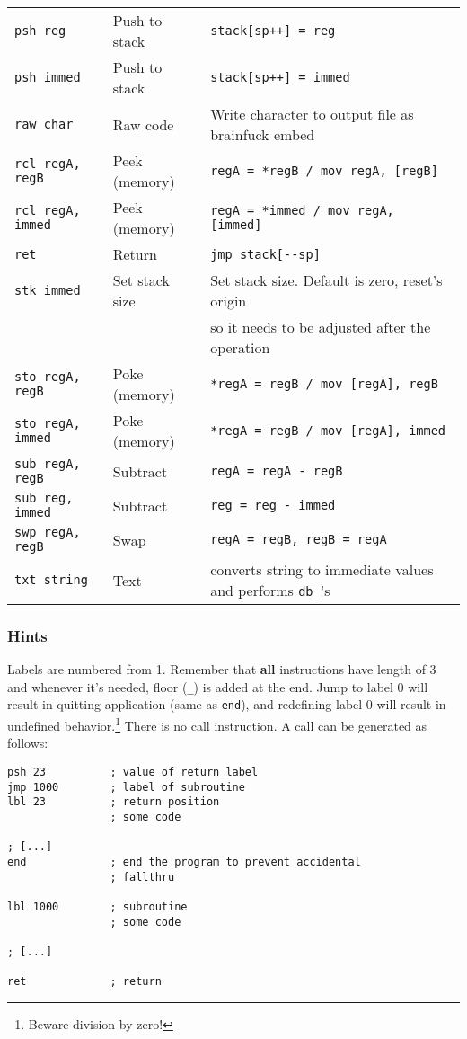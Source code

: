 \documentclass{article}
\begin{document}
\begin{table}[h]
\begin{longtable}{lll}
\verb|psh reg| & Push to stack & \verb|stack[sp++] = reg|     \\
\verb|psh immed| & Push to stack & \verb|stack[sp++] = immed|     \\
\verb|raw char| & Raw code & Write character to output file as brainfuck embed     \\
\verb|rcl regA, regB| & Peek (memory) & \verb|regA = *regB / mov regA, [regB]|      \\
\verb|rcl regA, immed| & Peek (memory) & \verb|regA = *immed / mov regA, [immed]|      \\
\verb|ret| & Return & \verb|jmp stack[--sp]|     \\
\verb|stk immed| & Set stack size & Set stack size. Default is zero, reset's origin       \\
 & & so it needs to be adjusted after the operation \\
\verb|sto regA, regB| & Poke (memory) & \verb|*regA = regB / mov [regA], regB|      \\
\verb|sto regA, immed| & Poke (memory) & \verb|*regA = regB / mov [regA], immed|      \\
\verb|sub regA, regB| & Subtract & \verb|regA = regA - regB|      \\
\verb|sub reg, immed| & Subtract & \verb|reg = reg - immed|      \\
\verb|swp regA, regB| & Swap & \verb|regA = regB, regB = regA|      \\
\verb|txt string| & Text & converts string to immediate values and performs \verb|db_|'s      \\

\end{longtable}
\end{table}

\restoregeometry

\newpage

\subsubsection{Hints}
\par Labels are numbered from 1. Remember that \textbf{all} instructions have length of 3 and whenever it's needed, floor (\verb|_|) is added at the end. Jump to label 0 will result in quitting application (same as \verb|end|), and redefining label 0 will result in undefined behavior.\footnote{Beware division by zero!} There is no call instruction.  A call can be generated as follows:

\begin{verbatim}
psh 23          ; value of return label
jmp 1000        ; label of subroutine
lbl 23          ; return position
                ; some code

; [...]
end             ; end the program to prevent accidental
                ; fallthru

lbl 1000        ; subroutine
                ; some code

; [...]

ret             ; return
\end{verbatim}
\end{document}
